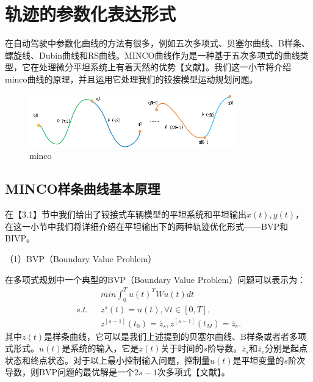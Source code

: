 \documentclass[master,academic]{ysuthesis} %
\begin{document}
	\section{轨迹的参数化表达形式}
	在自动驾驶中参数化曲线的方法有很多，例如五次多项式、贝塞尔曲线、B样条、螺旋线、Dubin曲线和RS曲线。MINCO曲线作为是一种基于五次多项式的曲线类型，它在处理微分平坦系统上有着天然的优势【文献】。我们这一小节将介绍minco曲线的原理，并且运用它处理我们的铰接模型运动规划问题。
	\begin{figure}[!ht]
		\centering
		\includegraphics[width=0.8\textwidth]{minco.png}
		\caption{minco}
		\label{fig:minco}
	\end{figure}
		\subsection{MINCO样条曲线基本原理}
		在【3.1】节中我们给出了铰接式车辆模型的平坦系统和平坦输出$x(t),y(t)$， 在这一小节中我们将详细介绍在平坦输出下的两种轨迹优化形式——BVP和BIVP。

		（1）BVP（Boundary Value Problem）

		在多项式规划中一个典型的BVP（Boundary Value Problem）问题可以表示为：
		\begin{equation}
			\begin{aligned}
				&min\int_0^T{u}(t) ^TWu(t) dt\\
				s.t. \ \ \ &z^s(t) =u(t) ,\forall t\in \left[ 0,T \right] ,\\
				&z^{\left[ s-1 \right]}( t_0 ) =\bar{z}_s,z^{\left[ s-1 \right]}( t_M ) =\bar{z}_e.
			\end{aligned}
		\end{equation}
		其中$z(t)$是样条曲线，它可以是我们上述提到的贝塞尔曲线、B样条或者者多项式形式。$u(t)$是系统的输入，它是$z(t)$关于时间的$s$阶导数。$\bar{z}_s$和$\bar{z}_e$分别是起点状态和终点状态。对于以上最小控制输入问题，控制量$u(t)$是平坦变量的$s$阶次导数，则BVP问题的最优解是一个$2s-1$次多项式【文献】。
\end{document}
